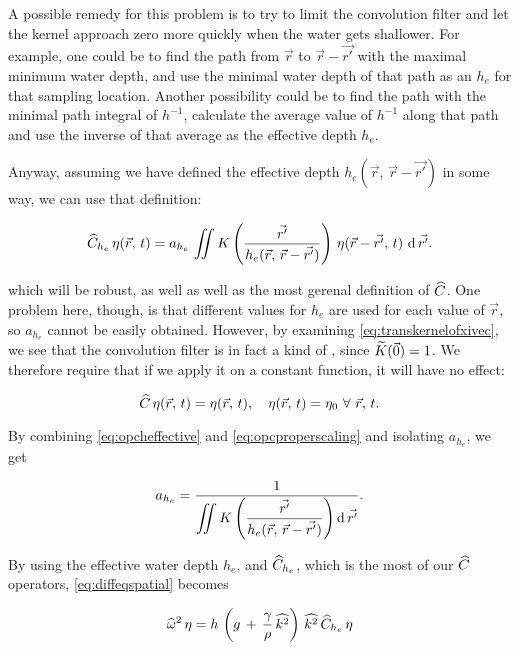 A possible remedy for this problem is to try to limit the convolution filter and let the kernel approach zero more quickly when the water gets shallower. For example, one could be to find the path from $\vec{r}$ to $\vec{r}-\vec{r'}$ with the maximal minimum water depth, and use the minimal water depth of that path as an  $h_e$ for that sampling location. Another possibility could be to find the path with the minimal path integral of $h^{-1}$, calculate the average value of $h^{-1}$ along that path and use the inverse of that average as the effective depth $h_e$.

Anyway, assuming we have defined the effective depth \mbox{$h_e(\vec{r},\,\vec{r}-\vec{r'})$} in some way, we can use that definition:

\begin{equation} \label{eq:opcheffective}
\widehat{C}_{h_e}\,\eta(\vec{r},\,t) = a_{h_e}\,\int\!\!\!\!\int K\left(\frac{\vec{r'}}{h_e(\vec{r},\,\vec{r}-\vec{r'})}\right)\,\eta(\vec{r}-\vec{r'},\,t)\,\operatorname{d}\vec{r'}.
\end{equation}

which will be robust, as well as well as the most gerenal definition of $\widehat{C}$. One problem here, though, is that different values for $h_e$ are used for each value of $\vec{r}$, so $a_{h_e}$ cannot be easily obtained. However, by examining \eqref{eq:transkernelofxivec}, we see that the convolution filter is in fact a kind of , since $\widetilde{K}(\vec{0}) = 1$. We therefore require that if we apply it on a constant function, it will have no effect:

\begin{equation} \label{eq:opcproperscaling}
\widehat{C}\,\eta(\vec{r},\,t) = \eta(\vec{r},\,t),\quad\eta(\vec{r},\,t) = \eta_0\ \forall\ \vec{r},\,t.
\end{equation}

By combining \eqref{eq:opcheffective} and \eqref{eq:opcproperscaling} and isolating $a_{h_e}$, we get

\begin{equation} \label{eq:scalingheffective}
a_{h_e} = \frac{1}{\displaystyle\int\!\!\!\!\int K\left(\frac{\vec{r'}}{h_e(\vec{r},\,\vec{r}-\vec{r'})}\right) \operatorname{d}\vec{r'}}.
\end{equation}

By using the effective water depth $h_e$, and $\widehat{C}_{h_e}$, which is the most  of our $\widehat{C}$ operators, \eqref{eq:diffeqspatial} becomes

\begin{equation} \label{eq:diffeqonehstillunknown}
\widehat{\omega}^2\,\eta = h\,\left(g\,+\,\frac{\gamma}{\rho}\,\widehat{k^2}\right)\,\widehat{k^2}\,\widehat{C}_{h_e}\,\eta
\end{equation}

